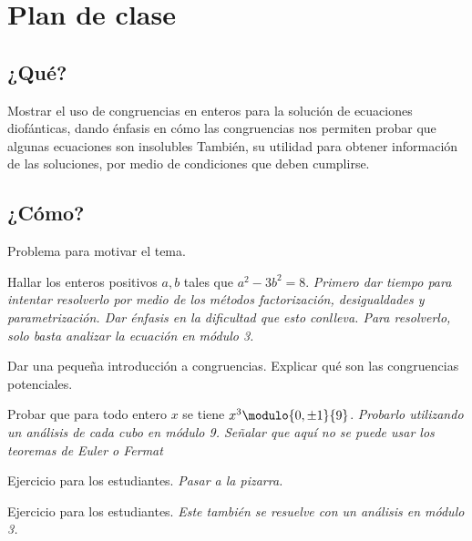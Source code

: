 \newpage
\section{Plan de clase}

\subsection{¿Qué?}

Mostrar el uso de congruencias en enteros para la solución de ecuaciones diofánticas, dando énfasis en cómo las
congruencias nos permiten probar que algunas ecuaciones son insolubles
También, su utilidad para obtener información de las soluciones, por medio de condiciones que deben cumplirse.

\subsection{¿Cómo?}

Problema para motivar el tema.\par
\begin{activity}[Ejercicio 2][10 min]
    Hallar los enteros positivos $a,b$ tales que $a^2 - 3b^2 = 8$.
    \textit{Primero dar tiempo para intentar resolverlo por medio de los métodos factorización, desigualdades y
        parametrización.
    Dar énfasis en la dificultad que esto conlleva.
    Para resolverlo, solo basta analizar la ecuación en módulo 3.}
\end{activity}

Dar una pequeña introducción a congruencias.
Explicar qué son las congruencias potenciales.\par
\begin{activity}[Prop. 6][10 min]
    Probar que para todo entero $x$ se tiene $x^3 \modulo{0,\pm 1}{9}$.
    \textit{Probarlo utilizando un análisis de cada cubo en módulo 9.
    Señalar que aquí no se puede usar los teoremas de Euler o Fermat}
\end{activity}

\begin{activity}[Ejercicio 1][15 min]
    Ejercicio para los estudiantes.
    \textit{Pasar a la pizarra.}
\end{activity}

\begin{activity}[Ejercicio 7][8 min]
    Ejercicio para los estudiantes.
    \textit{Este también se resuelve con un análisis en módulo 3.}
\end{activity}

